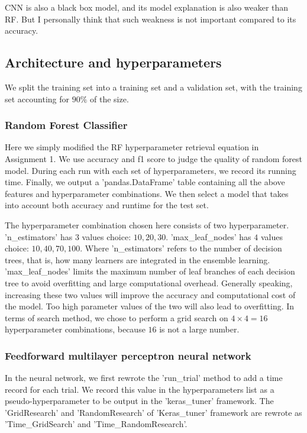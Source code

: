 CNN is also a black box model, and its model explanation is also weaker than RF. But I personally think that such weakness is not important compared to its accuracy.

\subsection{Architecture and hyperparameters}

\indent

We split the training set into a training set and a validation set, with the training set accounting for $90\%$ of the size.

\subsubsection{Random Forest Classifier}

\indent

Here we simply modified the RF hyperparameter retrieval equation in Assignment 1. We use accuracy and f1 score to judge the quality of random forest model. During each run with each set of hyperparameters, we record its running time. Finally, we output a ’pandas.DataFrame' table containing all the above features and hyperparameter combinations. We then select a model that takes into account both accuracy and runtime for the test set.

The hyperparameter combination chosen here consists of two hyperparameter. 'n\_estimators' has $3$ values choice: $10, 20, 30$. 'max\_leaf\_nodes' has $4$ values choice: $10, 40, 70, 100$. Where 'n\_estimators' refers to the number of decision trees, that is, how many learners are integrated in the ensemble learning. 'max\_leaf\_nodes' limits the maximum number of leaf branches of each decision tree to avoid overfitting and large computational overhead. Generally speaking, increasing these two values will improve the accuracy and computational cost of the model. Too high parameter values of the two will also lead to overfitting. In terms of search method, we chose to perform a grid search on $4\times4 = 16$ hyperparameter combinations, because $16$ is not a large number.

\subsubsection{Feedforward multilayer perceptron neural network}

\indent

In the neural network, we first rewrote the ’run\_trial' method to add a time record for each trial. We record this value in the hyperparameters list as a pseudo-hyperparameter to be output in the 'keras\_tuner' framework. The 'GridResearch' and 'RandomResearch' of 'Keras\_tuner' framework are rewrote as 'Time\_GridSearch' and 'Time\_RandomResearch'.


